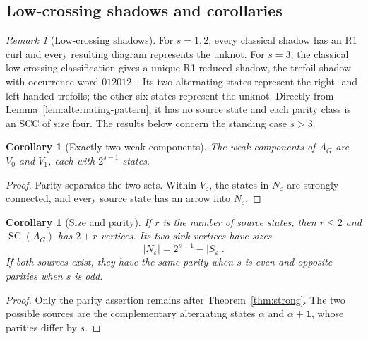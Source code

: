 \documentclass[11pt]{amsart}
\newtheorem{corollary}[theorem]{Corollary}
\theoremstyle{definition}
\theoremstyle{remark}
\newtheorem{remark}[theorem]{Remark}
\newcommand{\one}{\mathbf 1}
\begin{document}
\subsection{Low-crossing shadows and corollaries}\label{sec:knot-interpretation}

\begin{remark}[Low-crossing shadows]\label{rem:low-crossings}
For \(s=1,2\), every classical shadow has an R1 curl and every resulting
diagram represents the unknot.  For \(s=3\), the classical low-crossing
classification gives a unique R1-reduced shadow, the trefoil shadow with
occurrence word \(012012\)~\cite{DowkerThistlethwaite1983}.  Its
two alternating states represent the right- and left-handed trefoils; the
other six states represent the unknot.  Directly from
Lemma~\ref{lem:alternating-pattern}, it has no source state and each parity class is
an SCC of size four.  The results below concern the standing case \(s>3\).
\end{remark}



\begin{corollary}[Exactly two weak components]\label{cor:weak}
The weak components of \(A_G\) are \(V_0\) and \(V_1\), each with
\(2^{s-1}\) states.
\end{corollary}

\begin{proof}
Parity separates the two sets.  Within \(V_\varepsilon\), the states in
\(N_\varepsilon\) are strongly connected, and every source state has an
arrow into \(N_\varepsilon\).
\end{proof}

\begin{corollary}[Size and parity]\label{cor:source-sink-parity}
If \(r\) is the number of source states, then \(r\le2\) and
\(\operatorname{SC}(A_G)\) has \(2+r\) vertices.  Its two sink vertices have sizes
\[
  |N_\varepsilon|=2^{s-1}-|S_\varepsilon|.
\]
If both sources exist, they have the same parity when \(s\) is even and
opposite parities when \(s\) is odd.
\end{corollary}

\begin{proof}
Only the parity assertion remains after Theorem~\ref{thm:strong}.  The two
possible sources are the complementary alternating states \(\alpha\) and
\(\alpha+\one\), whose parities differ by \(s\).
\end{proof}
\end{document}
